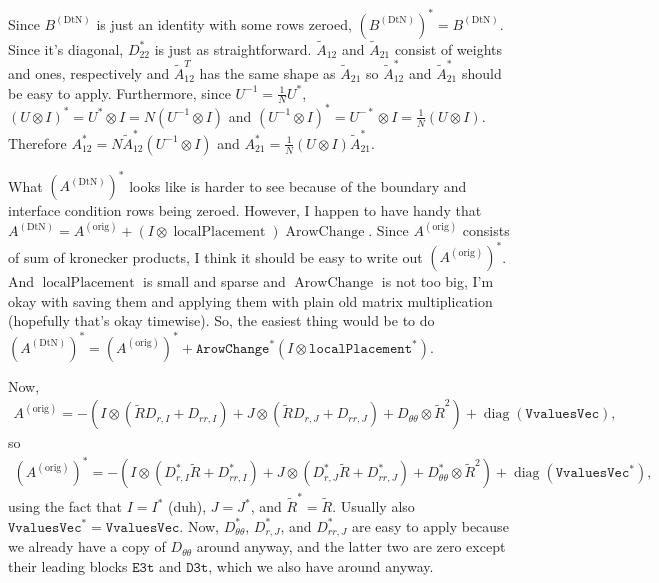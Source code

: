 \documentclass[letterpaper,12pt]{article}
\newcommand{\dtnA}{A^{(\text{DtN})}}
\newcommand{\dtnB}{B^{(\text{DtN})}}
\newcommand{\origA}{A^{(\text{orig})}}
\begin{document}
Since $\dtnB$ is just an identity with some rows zeroed,
$\left(\dtnB\right)^\ast = \dtnB$. Since it's diagonal, $D_{22}^\ast$ is just as 
straightforward. $\tilde{A}_{12}$ and $\tilde{A}_{21}$ consist of
weights and ones, respectively and $\tilde{A}_{12}^T$ has the same
shape as $\tilde{A}_{21}$ so $\tilde{A}_{12}^\ast$ and
$\tilde{A}_{21}^\ast$ should be easy to apply. Furthermore,
since $U^{-1} = \frac{1}{N}U^\ast$,
$(U\otimes I)^\ast = U^\ast \otimes I = N(U^{-1} \otimes I)$ and
$(U^{-1} \otimes I)^\ast = U^{-\ast} \otimes I = 
\frac{1}{N}(U \otimes I)$. Therefore
$A_{12}^\ast = N\tilde{A}_{12}^\ast (U^{-1} \otimes I)$ and
$A_{21}^\ast = \frac{1}{N} (U \otimes I) \tilde{A}_{21}^\ast$.

What $\left(\dtnA\right)^\ast$ looks like is harder to see because of the boundary
and interface condition rows being zeroed. However, I happen to have
handy that 
$\dtnA = \origA + (I \otimes \operatorname{localPlacement})
\operatorname{ArowChange}$. Since $\origA$ consists of sum of kronecker products,
I think it should be easy to write out $\left(\origA\right)^\ast$. And
$\operatorname{localPlacement}$ is small and sparse and
$\operatorname{ArowChange}$ is not too big, I'm okay with saving them and
applying them with plain old matrix multiplication (hopefully that's okay
timewise).
So, the easiest thing would be to do
$\left(\dtnA\right)^\ast = \left(\origA\right)^\ast + 
\texttt{ArowChange}^\ast (I \otimes \texttt{localPlacement}^\ast)$.

Now, 
\begin{align*}
 \origA = -\left( I \otimes (\tilde{R}D_{r,I} + D_{rr,I}) +
                  J \otimes (\tilde{R}D_{r,J} + D_{rr,J}) + 
                  D_{\theta\theta} \otimes \tilde{R}^2 \right)
        + \operatorname{diag}(\texttt{VvaluesVec}),
\end{align*}
so
\begin{align*}
 \left(\origA\right)^\ast 
        = -\left( I \otimes (D_{r,I}^\ast \tilde{R} + D_{rr,I}^\ast) +
                  J \otimes (D_{r,J}^\ast \tilde{R} + D_{rr,J}^\ast) + 
                  D_{\theta\theta}^\ast \otimes \tilde{R}^2 \right)
        + \operatorname{diag}(\texttt{VvaluesVec}^\ast),
\end{align*}
using the fact that $I = I^\ast$ (duh), $J = J^\ast$, and
$\tilde{R}^\ast = \tilde{R}$. Usually also
$\texttt{VvaluesVec}^\ast = \texttt{VvaluesVec}$. Now,
$D_{\theta\theta}^\ast$, $D_{r,J}^\ast$, and $D_{rr,J}^\ast$
are easy to apply because we already have a copy of 
$D_{\theta\theta}$ around anyway, and the latter two are
zero except their leading blocks $\texttt{E3t}$ and
$\texttt{D3t}$, which we also have around anyway.
\end{document}
